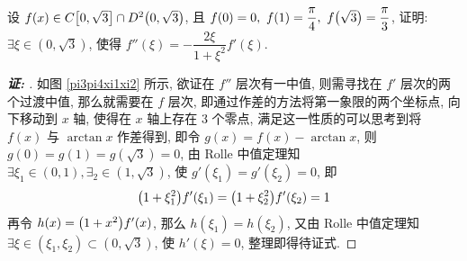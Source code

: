 \begin{example}
    设 $f(x)\in C\qty[0,\sqrt{3}]\cap D^2\qty(0,\sqrt{3})$, 且 $f(0)=0,~f(1)=\dfrac{\pi}{4},~f\qty(\sqrt{3})=\dfrac{\pi}{3}$, 证明: $\exists\xi\in(0,\sqrt{3})$, 使得 $f''(\xi)=-\dfrac{2\xi}{1+\xi^2}f'(\xi).$
\end{example}
\begin{proof}[{\songti \textbf{证: }}]
    如图 \ref{pi3pi4xi1xi2} 所示, 欲证在 $f''$ 层次有一中值, 则需寻找在 $f'$ 层次的两个过渡中值, 那么就需要在 $f$ 层次, 即通过作差的方法将第一象限的两个坐标点, 向下移动到 $x$ 轴, 使得在 $x$ 轴上存在 3 个零点, 
    满足这一性质的可以思考到将 $f(x)$ 与 $\arctan x$ 作差得到, 即令 $g(x)=f(x)-\arctan x$, 则 $g(0)=g(1)=g(\sqrt{3})=0$, 由 Rolle 中值定理知 $\exists\xi_1\in(0,1),\exists_2\in(1,\sqrt{3})$, 使 $g'(\xi_1)=g'(\xi_2)=0$, 即
    $$\qty(1+\xi_1^2)f'(\xi_1)=\qty(1+\xi_2^2)f'(\xi_2)=1$$
    再令 $h(x)=\qty(1+x^2)f'(x)$, 那么 $h(\xi_1)=h(\xi_2)$, 又由 Rolle 中值定理知 $\exists\xi\in(\xi_1,\xi_2)\subset(0,\sqrt{3})$, 使 $h'(\xi)=0$, 整理即得待证式.
\end{proof}

